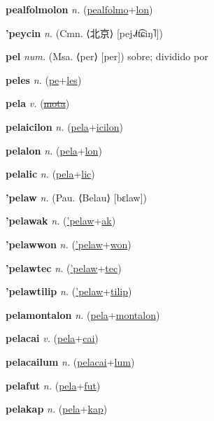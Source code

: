 \textbf{\hypertarget{pealfolmolon}{pealfolmolon}} \textit{n.} (\hyperlink{pealfolmo}{pealfolmo}+\allowbreak \hyperlink{lon}{lon})


\textbf{\hypertarget{'peycin}{'peycin}} \textit{n.} (Cmn. ⟨{\chinese{}北京}⟩ [pej˨˩˦t͡ɕiŋ˥])


\textbf{\hypertarget{pel}{pel}} \textit{num.} (Msa. ⟨per⟩ [per])
sobre; dividido por

\textbf{\hypertarget{peles}{peles}} \textit{n.} (\hyperlink{pe}{pe}+\allowbreak \hyperlink{les}{les})


\textbf{\hypertarget{pela}{pela}} \textit{v.} (\hyperlink{mota}{\sout{mota}})


\textbf{\hypertarget{pelaicilon}{pelaicilon}} \textit{n.} (\hyperlink{pela}{pela}+\allowbreak \hyperlink{icilon}{icilon})


\textbf{\hypertarget{pelalon}{pelalon}} \textit{n.} (\hyperlink{pela}{pela}+\allowbreak \hyperlink{lon}{lon})


\textbf{\hypertarget{pelalic}{pelalic}} \textit{n.} (\hyperlink{pela}{pela}+\allowbreak \hyperlink{lic}{lic})


\textbf{\hypertarget{'pelaw}{'pelaw}} \textit{n.} (Pau. ⟨Belau⟩ [bɛlaw])


\textbf{\hypertarget{'pelawak}{'pelawak}} \textit{n.} (\hyperlink{'pelaw}{'pelaw}+\allowbreak \hyperlink{ak}{ak})


\textbf{\hypertarget{'pelawwon}{'pelawwon}} \textit{n.} (\hyperlink{'pelaw}{'pelaw}+\allowbreak \hyperlink{won}{won})


\textbf{\hypertarget{'pelawtec}{'pelawtec}} \textit{n.} (\hyperlink{'pelaw}{'pelaw}+\allowbreak \hyperlink{tec}{tec})


\textbf{\hypertarget{'pelawtilip}{'pelawtilip}} \textit{n.} (\hyperlink{'pelaw}{'pelaw}+\allowbreak \hyperlink{tilip}{tilip})


\textbf{\hypertarget{pelamontalon}{pelamontalon}} \textit{n.} (\hyperlink{pela}{pela}+\allowbreak \hyperlink{montalon}{montalon})


\textbf{\hypertarget{pelacai}{pelacai}} \textit{v.} (\hyperlink{pela}{pela}+\allowbreak \hyperlink{cai}{cai})


\textbf{\hypertarget{pelacailum}{pelacailum}} \textit{n.} (\hyperlink{pelacai}{pelacai}+\allowbreak \hyperlink{lum}{lum})


\textbf{\hypertarget{pelafut}{pelafut}} \textit{n.} (\hyperlink{pela}{pela}+\allowbreak \hyperlink{fut}{fut})


\textbf{\hypertarget{pelakap}{pelakap}} \textit{n.} (\hyperlink{pela}{pela}+\allowbreak \hyperlink{kap}{kap})


